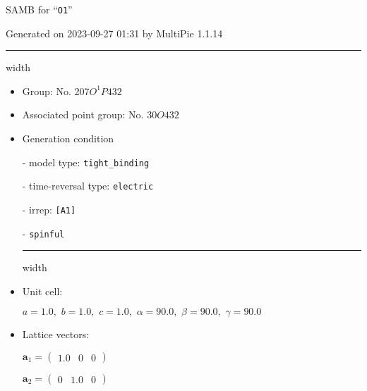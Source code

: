 \documentclass[fleqn,10pt,landscape]{article}
\begin{document}
\setcounter{MaxMatrixCols}{16}

\setlength{\baselineskip}{16pt}
\footnotesize
\begin{center}
\LARGE
SAMB for ``\texttt{O1}''
\end{center}
\begin{flushright}
Generated on 2023-09-27 01:31 by MultiPie 1.1.14
\end{flushright}
\vspace{1cm}


 \hfil \hrule height 1mm width \textwidth \hfil

\begin{itemize}
\item Group: No. 207\quad$O_{}^{1}$\quad$P432$\quad[ cubic ]

\item Associated point group: No. 30\quad$O$\quad$432$\quad[ cubic ]

\vspace{5mm}

\item Generation condition

\quad - model type: \texttt{tight_binding}

\quad - time-reversal type: \texttt{electric}

\quad - irrep: \texttt{[A1]}

\quad - \texttt{spinful}


 \hfil \hrule height 1mm width \textwidth \hfil

\item Unit cell:

\quad $a=1.0,\,\, b=1.0,\,\, c=1.0,\,\, \alpha=90.0,\,\, \beta=90.0,\,\, \gamma=90.0$

\item Lattice vectors:

\quad $\bm{a}_1=\begin{pmatrix} 1.0 & 0 & 0 \end{pmatrix}$

\quad $\bm{a}_2=\begin{pmatrix} 0 & 1.0 & 0 \end{pmatrix}$


\end{itemize}
\end{document}
